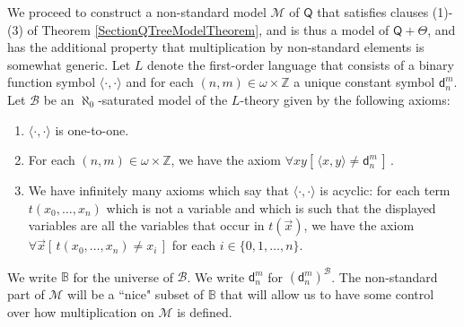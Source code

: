 \documentclass[10pt,a4paper, openany,  oldfontcommands]{memoir}
\newtheorem{open problem} [theorem] {Open Problem}
\newtheorem{open question} [theorem] {Open Question}
\begin{document}
We proceed to construct a non-standard model  $  \mathcal{M} $  of  $  \mathsf{Q} $  that satisfies clauses (1)-(3) of  
Theorem  \ref{SectionQTreeModelTheorem}, and is thus a model of  $  \mathsf{Q} +  \Theta  $,  
and has the additional property that multiplication by non-standard elements is somewhat generic. 
Let  $L$ denote the first-order language that consists of a binary function symbol  $  \langle  \cdot , \cdot   \rangle   $  
and for each  $  (n, m )  \in   \omega   \times  \mathbb{Z} $ a unique constant symbol  $  \mathsf{d}^m_n $.
Let  $  \mathcal{B} $  be an $  \aleph_0$-saturated model of the $L$-theory given by the following axioms: 
\begin{enumerate}

\item  $  \langle   \cdot  ,  \cdot   \rangle  $  is one-to-one. 

\item For each  $  (n, m )  \in   \omega   \times  \mathbb{Z} $, we have the axiom  
$  \forall x  y  \left[  \,   \langle x, y  \rangle   \neq       \mathsf{d}^m_n      \,   \right]    \,   $. 

\item  We have infinitely many axioms which say that   $   \langle \cdot , \cdot \rangle   $  is acyclic: 
for each  term   $ t (  x_0,  \ldots , x_n ) $ which is not  a variable  and which is  such that   the displayed variables are all the variables that occur in    $ t ( \vec{x} ) $, 
we have the axiom 
$  \forall  \vec{x} \left[  \,  t (  x_0,  \ldots , x_n )   \neq  x_i   \,   \right]  $  for each  $  i \in  \lbrace 0, 1,  \ldots , n  \rbrace  $.
\end{enumerate} 
We  write $  \mathbb{B} $   for the universe of     $  \mathcal{B}   $.
We write  $  \mathsf{d}^m_n   $  for     $  \left(   \mathsf{d}^m_n    \right)^{   \mathcal{B} }   $. 
The non-standard part of  $  \mathcal{M} $  will be a  ``nice" subset of    $  \mathbb{B}  $  that  will allow us  to have some control over  how multiplication on $  \mathcal{M} $  is defined. 
\end{document}
